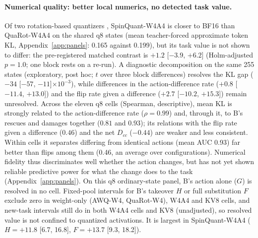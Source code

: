 \paragraph{Numerical quality: better local numerics, no detected task value.} Of two rotation-based quantizers \citep{ashkboos2024quarot,liu2025spinquant}, SpinQuant-W4A4 is closer to BF16 than QuaRot-W4A4 on the shared q8 states (mean teacher-forced approximate token KL, Appendix~\ref{app:panels}: 0.165 against 0.199), but its task value is not shown to differ: the pre-registered matched contrast is $+1.2$ [$-3.9$, $+6.2$]\pp{} (Holm-adjusted $p=1.0$; one block rests on a re-run). %
A diagnostic decomposition on the same 255 states (exploratory, post hoc; $t$ over three block differences) resolves the KL gap ($-34$ [$-57$, $-11$]$\times10^{-3}$), while differences in the action-difference rate ($+0.8$ [$-11.4$, $+13.0$]\pp{}) and the flip rate given a difference ($+2.7$ [$-10.2$, $+15.3$]\pp{}) remain unresolved. Across the eleven q8 cells (Spearman, descriptive), mean KL is strongly related to the action-difference rate ($\rho=0.99$) and, through it, to B's rescues and damages together ($0.81$ and $0.93$); its relations with the flip rate given a difference ($0.46$) and the net $D_{cc}$ ($-0.44$) are weaker and less consistent. Within cells it separates differing from identical actions (mean AUC 0.93) far better than flips among them (0.46, an average over configurations). Numerical fidelity thus discriminates well whether the action changes, but has not yet shown reliable predictive power for what the change does to the task (Appendix~\ref{app:panels}). %
On this q8 ordinary-state panel, B's action alone ($G$) is resolved in no cell. Fixed-pool intervals for B's takeover $H$ or full substitution $F$ exclude zero in weight-only (AWQ-W4, QuaRot-W4), W4A4 and KV8 cells, and new-task intervals still do in both W4A4 cells and KV8 (unadjusted), so resolved value is not confined to quantized activations. It is largest in SpinQuant-W4A4 ($H=+11.8$ [6.7, 16.8], $F=+13.7$ [9.3, 18.2]\pp{}). %

